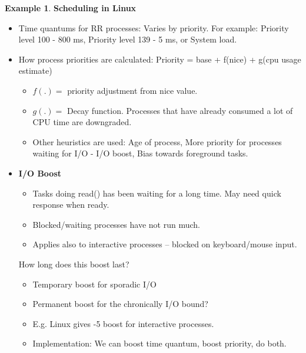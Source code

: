 \documentclass[12pt,a4paper]{article}
\theoremstyle{definition}
\newtheorem{example}{Example}[section]
\newenvironment{myitemize}
{ \begin{itemize}
    \setlength{\itemsep}{5pt}
    \setlength{\parskip}{0pt}
    \setlength{\parsep}{0pt}     }
{ \end{itemize}                  }
\begin{document}
\begin{example}{\textbf{Scheduling in Linux}}
\begin{myitemize}
\begin{tcolorbox}
			\begin{myitemize}
				\item CPU time used so far is recorded. Process is moved to a queue of blocked processes.
				\item When process becomes runnable again, it continues running until its time quantum is expired.
				\item It is then moved to the expired set.
				\item When a process becomes blocked its priority is often upgraded and given MORE CPU time to catch up.
			\end{myitemize}
		\end{tcolorbox}
		\item Time quantums for RR processes: Varies by priority. For example: Priority level 100 - 800 ms, Priority level 139 - 5 ms, or System load.
		\item How process priorities are calculated: Priority = base + f(nice) + g(cpu usage estimate)
		\begin{myitemize}
			\item $f(.) =$ priority adjustment from nice value.
			\item $g(.) =$ Decay function. Processes that have already consumed a lot of CPU time are downgraded.
			\item Other heuristics are used: Age of process, More priority for processes waiting for I/O - I/O boost, Bias towards foreground tasks.
		\end{myitemize}
		\item \textbf{I/O Boost}
		\begin{myitemize}
			\item Tasks doing read() has been waiting for a long time. May need quick response when ready.
			\item Blocked/waiting processes have not run much.
			\item Applies also to interactive processes – blocked on keyboard/mouse input.
		\end{myitemize}
		\begin{tcolorbox}
			\textsf{How long does this boost last?}
			\begin{myitemize}
				\item Temporary boost for sporadic I/O
				\item Permanent boost for the chronically I/O bound?
				\item E.g. Linux gives -5 boost for interactive processes.
				\item Implementation: We can boost time quantum, boost priority, do both.
			\end{myitemize}
		\end{tcolorbox}
	\end{myitemize}
\end{example}
\end{document}
